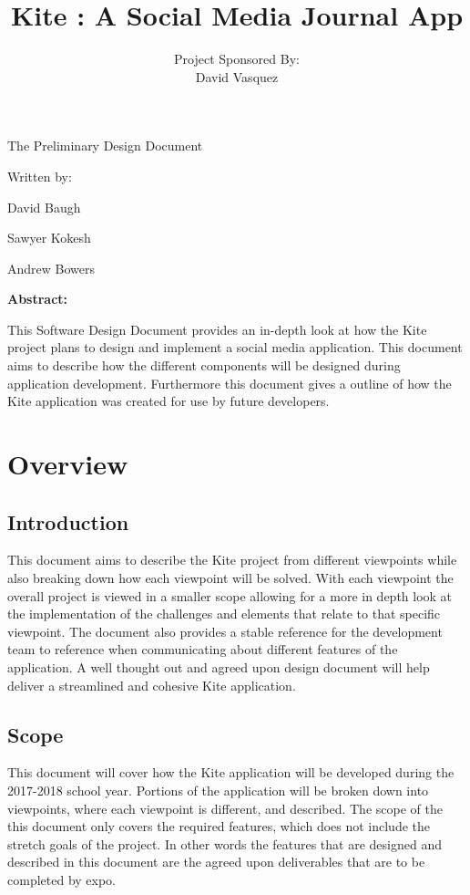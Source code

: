 \documentclass[compsoc, 10, draftclsnofoot, onecolumn]{IEEEtran}
\date{}
\title{Kite : A Social Media Journal App}
\author{ %
	Project Sponsored By: \\
    David Vasquez
}
\begin{document}
\null  %
\nointerlineskip  %
\vfill
\let\snewpage \newpage
\let\newpage \relax
\maketitle
\begin{center}
\huge{The Preliminary Design Document}\par
\vspace{2mm}
\large{Written by:}\par
\normalsize{David Baugh}\par
\normalsize{Sawyer Kokesh}\par
\normalsize{Andrew Bowers}\par
\vspace{8mm}
\large{\textbf{Abstract:}}\par 
\vspace{2mm}


\normalsize{This Software Design Document provides an in-depth look at how the Kite project plans to design and implement a social media application. This document aims to describe how the different components will be designed during application development. Furthermore this document gives a outline of how the Kite application was created for use by future developers.} 

\end{center}
\let \newpage \snewpage
\vfill 
\break %

\tableofcontents
\newpage

\section{Overview}
\subsection{Introduction}
This document aims to describe the Kite project from different viewpoints while also breaking down how each viewpoint will be solved. With each viewpoint the overall project is viewed in a smaller scope allowing for a more in depth look at the implementation of the challenges and elements that relate to that specific viewpoint. The document also provides a stable reference for the development team to reference when communicating about different features of the application. A well thought out and agreed upon design document will help deliver a streamlined and cohesive Kite application.   

\subsection{Scope}
This document will cover how the Kite application will be developed during the 2017-2018 school year. Portions of the application will be broken down into viewpoints, where each viewpoint is different, and described. The scope of the this document only covers the required features, which does not include the stretch goals of the project. In other words the features that are designed and described in this document are the agreed upon deliverables that are to be completed by expo.
\end{document}
